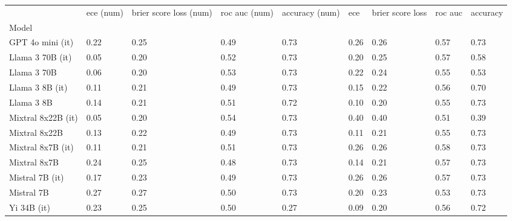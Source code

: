 \begin{tabular}{lllllllll}
\toprule
 & ece (num) & brier score loss (num) & roc auc (num) & accuracy (num) & ece & brier score loss & roc auc & accuracy \\
Model &  &  &  &  &  &  &  &  \\
\midrule
GPT 4o mini (it) & 0.22 & 0.25 & 0.49 & \cellcolor{cyan!25.0} 0.73 & 0.26 & 0.26 & \cellcolor{cyan!0.6} 0.57 & \cellcolor{cyan!25.0} 0.73 \\
Llama 3 70B (it) & 0.05 & \cellcolor{cyan!10.7} 0.20 & 0.52 & \cellcolor{cyan!25.0} 0.73 & 0.20 & \cellcolor{cyan!1.5} 0.25 & 0.57 & 0.58 \\
Llama 3 70B & 0.06 & \cellcolor{cyan!7.1} 0.20 & 0.53 & \cellcolor{cyan!20.7} 0.73 & 0.22 & \cellcolor{cyan!4.8} 0.24 & 0.55 & 0.53 \\
Llama 3 8B (it) & 0.11 & 0.21 & 0.49 & \cellcolor{cyan!23.4} 0.73 & 0.15 & \cellcolor{cyan!13.7} 0.22 & 0.56 & \cellcolor{cyan!5.3} 0.70 \\
Llama 3 8B & 0.14 & 0.21 & 0.51 & \cellcolor{cyan!19.1} 0.72 & \cellcolor{cyan!12.5} 0.10 & \cellcolor{cyan!21.7} 0.20 & 0.55 & \cellcolor{cyan!24.5} 0.73 \\
Mixtral 8x22B (it) & 0.05 & \cellcolor{cyan!17.9} 0.20 & \cellcolor{cyan!25.0} 0.54 & \cellcolor{cyan!25.0} 0.73 & 0.40 & 0.40 & \cellcolor{orange!12.8} 0.51 & 0.39 \\
Mixtral 8x22B & 0.13 & 0.22 & 0.49 & \cellcolor{cyan!25.0} 0.73 & \cellcolor{cyan!10.2} 0.11 & \cellcolor{cyan!21.2} 0.21 & 0.55 & \cellcolor{cyan!25.0} 0.73 \\
Mixtral 8x7B (it) & 0.11 & 0.21 & 0.51 & \cellcolor{cyan!25.0} 0.73 & 0.26 & 0.26 & \cellcolor{cyan!12.8} 0.58 & \cellcolor{cyan!25.0} 0.73 \\
Mixtral 8x7B & 0.24 & 0.25 & \cellcolor{orange!25.0} 0.48 & \cellcolor{cyan!25.0} 0.73 & \cellcolor{cyan!0.8} 0.14 & \cellcolor{cyan!18.9} 0.21 & 0.57 & \cellcolor{cyan!25.0} 0.73 \\
Mistral 7B (it) & 0.17 & 0.23 & 0.49 & \cellcolor{cyan!24.5} 0.73 & 0.26 & 0.26 & 0.57 & \cellcolor{cyan!25.0} 0.73 \\
Mistral 7B & \cellcolor{orange!25.0} 0.27 & \cellcolor{orange!25.0} 0.27 & 0.50 & \cellcolor{cyan!25.0} 0.73 & 0.20 & \cellcolor{cyan!8.6} 0.23 & 0.53 & \cellcolor{cyan!23.4} 0.73 \\
Yi 34B (it) & 0.23 & 0.25 & 0.50 & \cellcolor{orange!25.0} 0.27 & \cellcolor{cyan!18.2} 0.09 & \cellcolor{cyan!23.1} 0.20 & 0.56 & \cellcolor{cyan!15.4} 0.72 \\

\end{tabular}
